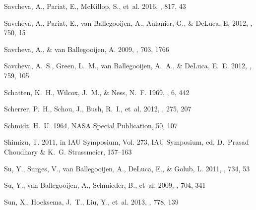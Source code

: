\documentclass[preprint]{aastex}
\begin{document}
\begin{thebibliography}{45}
	{Savcheva}, A., {Pariat}, E., {McKillop}, S., {et~al.} 2016, \apj, 817, 43

{Savcheva}, A., {Pariat}, E., {van Ballegooijen}, A., {Aulanier}, G., \&
  {DeLuca}, E. 2012{}, \apj, 750, 15

{Savcheva}, A., \& {van Ballegooijen}, A. 2009, \apj, 703, 1766

{Savcheva}, A.~S., {Green}, L.~M., {van Ballegooijen}, A.~A., \& {DeLuca},
  E.~E. 2012{}, \apj, 759, 105

{Schatten}, K.~H., {Wilcox}, J.~M., \& {Ness}, N.~F. 1969, \solphys, 6, 442

{Scherrer}, P.~H., {Schou}, J., {Bush}, R.~I., {et~al.} 2012, \solphys, 275,
  207

{Schmidt}, H.~U. 1964, NASA Special Publication, 50, 107

{Shimizu}, T. 2011, in IAU Symposium, Vol. 273, IAU Symposium, ed. D.~{Prasad
  Choudhary} \& K.~G. {Strassmeier}, 157--163

{Su}, Y., {Surges}, V., {van Ballegooijen}, A., {DeLuca}, E., \& {Golub}, L.
  2011, \apj, 734, 53

{Su}, Y., {van Ballegooijen}, A., {Schmieder}, B., {et~al.} 2009, \apj, 704,
  341

{Sun}, X., {Hoeksema}, J.~T., {Liu}, Y., {et~al.} 2013, \apj, 778, 139


\end{thebibliography}
\end{document}
